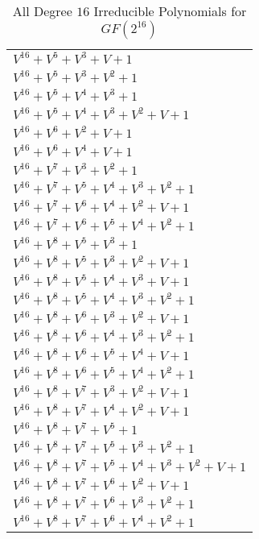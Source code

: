 \documentclass[12pt]{article}
\begin{document}
\begin{adjustwidth}{-4cm}{}
\begin{center}
\begin{longtable}{|l|}
\caption[asd]{All Degree $16$ Irreducible Polynomials for $GF(2^{16})$} \\
\hline
	$V^{16}  +V^{5}  +V^{3}  + V + 1$ \\
$V^{16}  +V^{5}  +V^{3}  +V^{2}  + 1$ \\
$V^{16}  +V^{5}  +V^{4}  +V^{3}  + 1$ \\
$V^{16}  +V^{5}  +V^{4}  +V^{3}  +V^{2}  + V + 1$ \\
$V^{16}  +V^{6}  +V^{2}  + V + 1$ \\
$V^{16}  +V^{6}  +V^{4}  + V + 1$ \\
$V^{16}  +V^{7}  +V^{3}  +V^{2}  + 1$ \\
$V^{16}  +V^{7}  +V^{5}  +V^{4}  +V^{3}  +V^{2}  + 1$ \\
$V^{16}  +V^{7}  +V^{6}  +V^{4}  +V^{2}  + V + 1$ \\
$V^{16}  +V^{7}  +V^{6}  +V^{5}  +V^{4}  +V^{2}  + 1$ \\
$V^{16}  +V^{8}  +V^{5}  +V^{3}  + 1$ \\
$V^{16}  +V^{8}  +V^{5}  +V^{3}  +V^{2}  + V + 1$ \\
$V^{16}  +V^{8}  +V^{5}  +V^{4}  +V^{3}  + V + 1$ \\
$V^{16}  +V^{8}  +V^{5}  +V^{4}  +V^{3}  +V^{2}  + 1$ \\
$V^{16}  +V^{8}  +V^{6}  +V^{3}  +V^{2}  + V + 1$ \\
$V^{16}  +V^{8}  +V^{6}  +V^{4}  +V^{3}  +V^{2}  + 1$ \\
$V^{16}  +V^{8}  +V^{6}  +V^{5}  +V^{4}  + V + 1$ \\
$V^{16}  +V^{8}  +V^{6}  +V^{5}  +V^{4}  +V^{2}  + 1$ \\
$V^{16}  +V^{8}  +V^{7}  +V^{3}  +V^{2}  + V + 1$ \\
$V^{16}  +V^{8}  +V^{7}  +V^{4}  +V^{2}  + V + 1$ \\
$V^{16}  +V^{8}  +V^{7}  +V^{5}  + 1$ \\
$V^{16}  +V^{8}  +V^{7}  +V^{5}  +V^{3}  +V^{2}  + 1$ \\
$V^{16}  +V^{8}  +V^{7}  +V^{5}  +V^{4}  +V^{3}  +V^{2}  + V + 1$ \\
$V^{16}  +V^{8}  +V^{7}  +V^{6}  +V^{2}  + V + 1$ \\
$V^{16}  +V^{8}  +V^{7}  +V^{6}  +V^{3}  +V^{2}  + 1$ \\
$V^{16}  +V^{8}  +V^{7}  +V^{6}  +V^{4}  +V^{2}  + 1$ \\

\end{longtable}
\end{center}
\end{adjustwidth}
\end{document}
